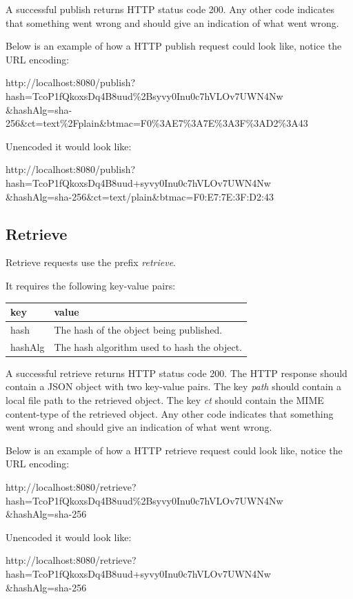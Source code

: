 A successful publish returns HTTP status code 200. Any other code indicates that something went wrong and should give an indication of what went wrong.

Below is an example of how a HTTP publish request could look like, notice the URL encoding:

http://localhost:8080/publish?hash=TcoP1fQkoxsDq4B8uud\%2Bsyvy0Inu0c7hVLOv7UWN4Nw \\ \&hashAlg=sha-256\&ct=text\%2Fplain\&btmac=F0\%3AE7\%3A7E\%3A3F\%3AD2\%3A43

Unencoded it would look like:

http://localhost:8080/publish?hash=TcoP1fQkoxsDq4B8uud+syvy0Inu0c7hVLOv7UWN4Nw \\ \&hashAlg=sha-256\&ct=text/plain\&btmac=F0:E7:7E:3F:D2:43

\subsection{Retrieve}

Retrieve requests use the prefix \emph{retrieve}.

It requires the following key-value pairs:

\begin{tabular}{ | l | l | }
	\hline
	key & value  \\ \hline \hline
	hash & The hash of the object being published.  \\ \hline
	hashAlg & The hash algorithm used to hash the object. \\ \hline
\end{tabular}

A successful retrieve returns HTTP status code 200. The HTTP response should contain a JSON object with two key-value pairs. The key \emph{path} should contain a local file path to the retrieved object. The key \emph{ct} should contain the MIME content-type of the retrieved object. Any other code indicates that something went wrong and should give an indication of what went wrong.

Below is an example of how a HTTP retrieve request could look like, notice the URL encoding:

http://localhost:8080/retrieve?hash=TcoP1fQkoxsDq4B8uud\%2Bsyvy0Inu0c7hVLOv7UWN4Nw \\ \&hashAlg=sha-256

Unencoded it would look like:

http://localhost:8080/retrieve?hash=TcoP1fQkoxsDq4B8uud+syvy0Inu0c7hVLOv7UWN4Nw \\ \&hashAlg=sha-256

